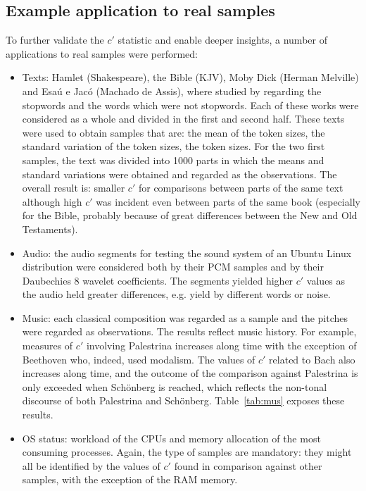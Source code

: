 \documentclass[12pt,fleqn]{article}
\begin{document}
\subsection{Example application to real samples}
To further validate the $c'$ statistic and enable deeper insights,
a number of applications to real samples were performed:
\begin{itemize}
	\item Texts: Hamlet (Shakespeare), the Bible (KJV), Moby Dick (Herman Melville) and Esaú e Jacó (Machado de Assis),
		where studied by regarding the stopwords and the words which were not stopwords.
		Each of these works were considered as a whole and divided in the first and second half.
                These texts were used to obtain samples that are:
		the mean of the token sizes, the standard variation of the token sizes,
		the token sizes.
		For the two first samples, the text was divided into 1000 parts in which the means
		and standard variations were obtained and regarded as the observations.
		The overall result is: smaller $c'$ for comparisons between parts of the same text
		although high $c'$ was incident even between parts of the same book (especially for the Bible,
		probably because of great differences between the New and Old Testaments).
	\item Audio: the audio segments for testing the sound system of an Ubuntu Linux distribution
		were considered both by their PCM samples and by their Daubechies 8 wavelet coefficients.
		The segments yielded higher $c'$ values as the audio held greater differences, e.g. yield by different words
		or noise.
	\item Music: each classical composition was regarded as a sample
		and the pitches were regarded as observations.
		The results reflect music history.
		For example, measures of $c'$ involving Palestrina
		increases along time with the exception of Beethoven
		who, indeed, used modalism.
		The values of $c'$ related to Bach also increases along time,
		and the outcome of the comparison against Palestrina 
		is only exceeded when Sch\"onberg is reached,
		which reflects the non-tonal discourse of both
		Palestrina and Sch\"onberg.
		Table~\ref{tab:mus} exposes these results.
	\item OS status: workload of the CPUs and memory allocation of the most consuming processes.
		Again, the type of samples are mandatory:
		they might all be identified by the values of $c'$
		found in comparison against other samples,
		with the exception of the RAM memory.
\end{itemize}
\end{document}
